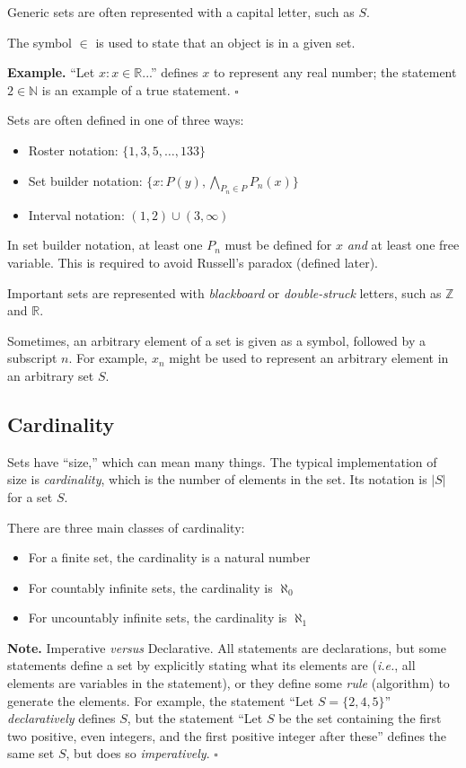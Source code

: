 \documentclass[letterpaper,twoside]{article}
\def\SmallHSpace{\hspace*{1mm}}
\newcommand\Ie[1]{\textit{i.e.}, #1}
\newcommand{\Note}[1]{%
    \emoji{warning} \textbf{Note.}\SmallHSpace #1 \hfill $\square$
}
\newcommand{\Example}[1]{%
    \emoji{magnifying-glass-tilted-right} \textbf{Example.}\SmallHSpace #1 \hfill $\square$
}
\newenvironment{SorrellItemize}
{
    \setlength\parskip{-5pt}
    \begin{itemize}[leftmargin=11pt]
        \setlength\itemsep{-4pt}
}{
    \end{itemize}
}
\begin{document}
\begin{multicols}{2}
Generic sets are often represented with a capital letter, such as $S$.

The symbol $\in$ is used to state that an object is in a given set.

\Example
{
    ``Let $x : x \in \mathbb{R}$...'' defines $x$ to represent any real number; the statement $2 \in \mathbb{N}$ is an example of a true statement.
}

Sets are often defined in one of three ways:
\begin{SorrellItemize}
    \item Roster notation: $\{1, 3, 5, \ldots, 133\}$
    \item Set builder notation: $\{ x : P(y), \bigwedge\limits_{P_n \in P} P_n(x) \}$
    \item Interval notation: $(1, 2) \cup (3, \infty)$
\end{SorrellItemize}

In set builder notation, at least one $P_n$ must be defined for $x$ \textit{and} at least one free variable.
This is required to avoid Russell's paradox (defined later).

Important sets are represented with \textit{blackboard} or \textit{double-struck} letters, such as $\mathbb{Z}$ and $\mathbb{R}$.

Sometimes, an arbitrary element of a set is given as a symbol, followed by a subscript $n$.
For example, $x_n$ might be used to represent an arbitrary element in an arbitrary set $S$.

\subsection{Cardinality}

Sets have ``size,'' which can mean many things.
The typical implementation of size is \textit{cardinality}, which is the number of elements in the set.
Its notation is $|S|$ for a set $S$.

There are three main classes of cardinality:
\begin{SorrellItemize}
    \item For a finite set, the cardinality is a natural number
    \item For countably infinite sets, the cardinality is $\aleph_0$
    \item For uncountably infinite sets, the cardinality is $\aleph_1$
\end{SorrellItemize}

\Note
{
    Imperative \textit{versus} Declarative.
    All statements are declarations, but some statements define a set by explicitly stating what its elements are (\Ie{all elements are variables in the statement}), or they define some \textit{rule} (algorithm) to generate the elements.
    For example, the statement ``Let $S = \{2, 4, 5\}$'' \textit{declaratively} defines $S$, but the statement ``Let $S$ be the set containing the first two positive, even integers, and the first positive integer after these'' defines the same set $S$, but does so \textit{imperatively}.
}


\end{multicols}
\end{document}
